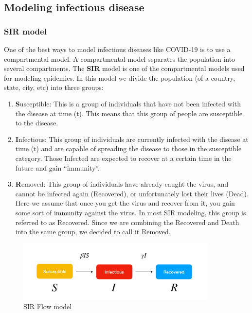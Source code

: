 \documentclass[11pt]{article}
\begin{document}
\subsection{Modeling infectious disease}
\subsubsection{SIR model}
One of the best ways to model infectious diseases like COVID-19 is to use a compartmental model. A compartmental model separates the population into several compartments. The \textbf{SIR} model is one of the compartmental models used for modeling epidemics. In this model we divide the population (of a country, state, city, etc) into three groups:
\begin{enumerate}
    \item \textbf{S}usceptible: This is a group of individuals that have not been infected with the disease at time (t). This means that this group of people are susceptible to the disease.
    \item\textbf{I}nfectious: This group of individuals are currently infected with the disease at time (t) and are capable of spreading the disease to those in the susceptible category. Those Infected are expected to recover at a certain time in the future and gain “immunity”.
    \item \textbf{R}emoved: This group of individuals have already caught the virus, and cannot be infected again (Recovered), or unfortunately lost their lives (Dead). Here we assume that once you get the virus and recover from it, you gain some sort of immunity against the virus. In most SIR modeling, this group is referred to as Recovered. Since we are combining the Recovered and Death into the same group, we decided to call it Removed. 
\end{enumerate}

\begin{figure}[h]
\includegraphics[width=10cm]{images/sir.png}
\centering
\caption{SIR Flow model \cite{sir-model-flow}}
\label{fig:sir-flow}
\end{figure}
\end{document}
